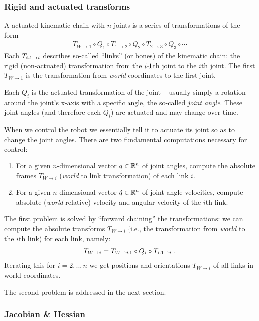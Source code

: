 \subsubsection{Rigid and actuated transforms}

A actuated kinematic chain with $n$ joints is a series of transformations of the form
\begin{align}
T_{W\to 1} \circ Q_1 \circ T_{1\to2} \circ Q_2 \circ T_{2\to3} \circ
Q_3 \circ \cdots
\end{align}
Each $T_{i{{\hspace*{-.0pt}\text{\rm -}\hspace*{-.5pt}}1}\to i}$ describes so-called ``links'' (or bones) of the
kinematic chain: the rigid (non-actuated) transformation from the
$i{{\hspace*{-.0pt}\text{\rm -}\hspace*{-.5pt}}1}$th joint to the $i$th joint. The first $T_{W\to 1}$ is the
transformation from \emph{world} coordinates to the first joint.

Each $Q_i$ is the actuated transformation of the joint -- usually simply
a rotation around the joint's x-axis with a specific angle, the
so-called \emph{joint angle}. These joint angles (and therefore each
$Q_i$) are actuated and may change over time.

When we control the robot we essentially tell it to actuate its joint
so as to change the joint angles. There are two fundamental
computations necessary for control:
\begin{enumerate}
\item For a given $n$-dimensional vector $q \in {\mathbb{R}}^n$ of joint
angles, compute the absolute frames $T_{W\to i}$ (\emph{world} to link
transformation) of each link $i$.
\item For a given $n$-dimensional vector $\dot q \in {\mathbb{R}}^n$ of joint
angle velocities, compute absolute (\emph{world}-relative) velocity
and angular velocity of the $i$th link.
\end{enumerate}

The first problem is solved by ``forward chaining'' the
transformations: we can compute the absolute transforms $T_{W\to i}$
(i.e., the transformation from \emph{world} to the $i$th link) for
each link, namely:
\begin{align}
T_{W\to i} = T_{W\to i{{\hspace*{-.0pt}\text{\rm -}\hspace*{-.5pt}}1}} \circ Q_i \circ T_{i{{\hspace*{-.0pt}\text{\rm -}\hspace*{-.5pt}}1}\to i} ~.
\end{align}
Iterating this for $i=2,..,n$ we get positions and orientations
$T_{W\to i}$ of all links in world coordinates.

The second problem is addressed in the next section.


\subsubsection{Jacobian \& Hessian}

